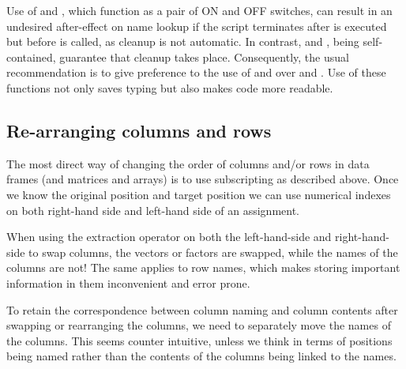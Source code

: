 \documentclass[krantz2]{krantz}\usepackage{knitr}
\begin{document}
\begin{explainbox}
Use of  and , which function as a pair of ON and OFF switches, can result in an undesired after-effect on name lookup if the script terminates after  is executed but before  is called, as cleanup is not automatic. In contrast,  and , being self-contained, guarantee that cleanup takes place. Consequently, the usual recommendation is to give preference to the use of  and  over  and . Use of these functions not only saves typing but also makes code more readable.
\end{explainbox}

\subsection{Re-arranging columns and rows}
The most direct way of changing the order of columns and/or rows in data frames (and matrices and arrays) is to use subscripting as described above. Once we know the original position and target position we can use numerical indexes on both right-hand side and left-hand side of an assignment.

\begin{warningbox}
When using the extraction operator \Roperator{[]} on both the left-hand-side and right-hand-side to swap columns, the vectors or factors are swapped, while the names of the columns are not! The same applies to row names, which makes storing important information in them inconvenient and error prone.
\end{warningbox}

To retain the correspondence between column naming and column contents after swapping or rearranging the columns, we need to separately move the names of the columns. This seems counter intuitive, unless we think in terms of positions being named rather than the contents of the columns being linked to the names.
\end{document}
